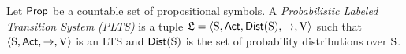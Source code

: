 \begin{definition}\label{def:plts}
    Let $\PROP$ be a countable set of propositional symbols. 
    A \emph{Probabilistic Labeled Transition System (PLTS)}  is a tuple
    $\model=\tup{\S,\ACT,\dist(\S),\ra,\V}$ such that $\tup{\S,\ACT,\ra,\V}$ is an LTS and $\dist(\S)$ is the set of probability distributions over $\S$.
\end{definition}